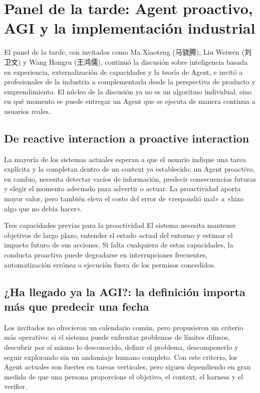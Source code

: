 \section{Panel de la tarde: Agent proactivo, AGI y la implementación industrial}

El panel de la tarde, con invitados como Ma Xiaoteng (马骁腾), Liu Weiwen (刘卫文) y Wang Hongru (王鸿儒), continuó la discusión sobre inteligencia basada en experiencia, externalización de capacidades y la teoría de Agent, e invitó a profesionales de la industria a complementarla desde la perspectiva de producto y emprendimiento. El núcleo de la discusión ya no es un algoritmo individual, sino en qué momento se puede entregar un Agent que se ejecuta de manera continua a usuarios reales.

\subsection{De reactive interaction a proactive interaction}

La mayoría de los sistemas actuales esperan a que el usuario indique una tarea explícita y la completan dentro de un context ya establecido; un Agent proactivo, en cambio, necesita detectar vacíos de información, predecir consecuencias futuras y elegir el momento adecuado para advertir o actuar. La proactividad aporta mayor valor, pero también eleva el costo del error de «respondió mal» a «hizo algo que no debía hacer».

\begin{importantbox}{Tres capacidades previas para la proactividad}
El sistema necesita mantener objetivos de largo plazo, entender el estado actual del entorno y estimar el impacto futuro de sus acciones. Si falta cualquiera de estas capacidades, la conducta proactiva puede degradarse en interrupciones frecuentes, automatización errónea o ejecución fuera de los permisos concedidos.
\end{importantbox}

\subsection{¿Ha llegado ya la AGI?: la definición importa más que predecir una fecha}

Los invitados no ofrecieron un calendario común, pero propusieron un criterio más operativo: si el sistema puede enfrentar problemas de límites difusos, descubrir por sí mismo lo desconocido, definir el problema, descomponerlo y seguir explorando sin un andamiaje humano completo. Con este criterio, los Agent actuales son fuertes en tareas verticales, pero siguen dependiendo en gran medida de que una persona proporcione el objetivo, el context, el harness y el verifier.

